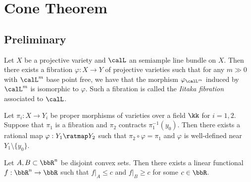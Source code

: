 \section{Cone Theorem}


\subsection{Preliminary}

    \begin{theorem}\label{thm: Iitaka fibration in semiample case}
        Let \(X\) be a projective variety and \(\calL\) an semiample line bundle on \(X\).
        Then there exists a fibration \(\varphi: X \to Y\) of projective varieties 
        such that for any \(m\gg 0\) with \(\calL^m\) base point free, we have that the morphism \(\varphi_{\calL^m}\) induced by \(\calL^m\) is isomorphic to \(\varphi\).
        Such a fibration is called the \emph{Iitaka fibration} associated to \(\calL\).
    \end{theorem}

    \begin{theorem}\label{thm: Rigidity Lemma}
        Let \(\pi_i: X \to Y_i\) be proper morphisms of varieties over a field \(\kk\) for \(i=1,2\).
        Suppose that \(\pi_1\) is a fibration and \(\pi_2\) contracts \(\pi_1^{-1}(y_0)\).
        Then there exists a rational map \(\varphi: Y_1 \ratmap Y_2\) such that \(\pi_2 \circ \varphi = \pi_1\) and \(\varphi\) is well-defined near \(Y_1 \setminus \{y_0\}\). 
    \end{theorem}

    \begin{theorem}\label{thm:convex_separation_theorem}
        Let \(A,B \subset \bbR^n\) be disjoint convex sets.
        Then there exists a linear functional \(f: \bbR^n \to \bbR\) such that \(f|_A \leq c\) and \(f|_B \geq c\) for some \(c \in \bbR\).
    \end{theorem}



